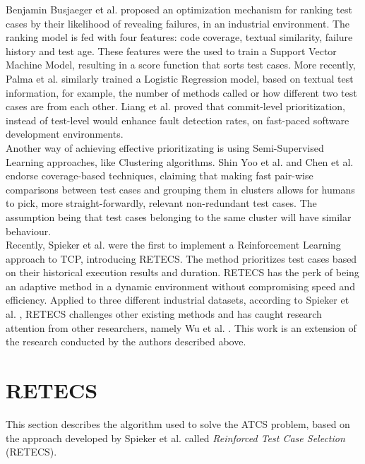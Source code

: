 Benjamin Busjaeger et al. \cite{learningfortcp} proposed an optimization mechanism for ranking test cases by their likelihood of revealing failures, in an industrial environment. The ranking model is fed with four features: code coverage, textual similarity, failure history and test age. These features were the used to train a Support Vector Machine Model, resulting in a score function that sorts test cases. More recently, Palma et al. \cite{palma} similarly trained a Logistic Regression model, based on textual test information, for example, the number of methods called or how different two test cases are from each other. Liang et al. \cite{liang} proved that commit-level prioritization, instead of test-level would enhance fault detection rates, on fast-paced software development environments. 
\\

Another way of achieving effective prioritizating is using Semi-Supervised Learning approaches, like Clustering algorithms. Shin Yoo et al. \cite{Shinyoo} and Chen et al. \cite{chen} endorse coverage-based techniques, claiming that making fast pair-wise comparisons between test cases and grouping them in clusters allows for humans to pick, more straight-forwardly, relevant non-redundant test cases. The assumption being that test cases belonging to the same cluster will have similar behaviour.
\\

Recently, Spieker et al. \cite{Spieker} were the first to implement a Reinforcement Learning approach to TCP, introducing RETECS. The method prioritizes test cases based on their historical execution results and duration. RETECS has the perk of being an adaptive method in a dynamic environment without compromising speed and efficiency. Applied to three different industrial datasets, according to Spieker et al. \cite{Spieker}, RETECS challenges other existing methods and has caught research attention from other researchers, namely Wu et al.  \cite{time-window}. This work is an extension of the research conducted by the authors described above.


\section{RETECS}\label{retecs}

This section describes the algorithm used to solve the ATCS problem, based on the approach developed by Spieker et al. \cite{Spieker} called \textit{Reinforced Test Case Selection} (RETECS). 



